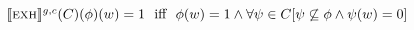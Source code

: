 $\intension[g,c]{\scshape{exh}}(C)(\phi)(w)=\textiff\phi(w)=1\land\forall\psi\in{C}[\psi\not\subseteq\phi\land\psi(w)=0]$%
